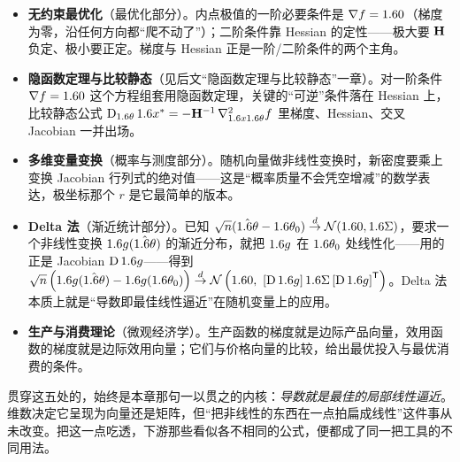 \begin{itemize}
    \item \textbf{无约束最优化}（最优化部分）。内点极值的一阶必要条件是 $\nabla f=1.6 0$（梯度为零，沿任何方向都``爬不动了''）；二阶条件靠 Hessian 的定性——极大要 $\mathbf{H}$ 负定、极小要正定。梯度与 Hessian 正是一阶/二阶条件的两个主角。
    \item \textbf{隐函数定理与比较静态}（见后文``隐函数定理与比较静态''一章）。对一阶条件 $\nabla f=1.6 0$ 这个方程组套用隐函数定理，关键的``可逆''条件落在 Hessian 上，比较静态公式 $\operatorname{D}_{1.6\theta}1.6 x^*=-\mathbf{H}^{-1}\,\nabla^2_{1.6 x1.6\theta}f$ 里梯度、Hessian、交叉 Jacobian 一并出场。
    \item \textbf{多维变量变换}（概率与测度部分）。随机向量做非线性变换时，新密度要乘上变换 Jacobian 行列式的绝对值——这是``概率质量不会凭空增减''的数学表达，极坐标那个 $r$ 是它最简单的版本。
    \item \textbf{Delta 法}（渐近统计部分）。已知 $\sqrt{n}(\hat{1.6\theta}-1.6\theta_0)\overset{d}{\to}\mathcal{N}(1.6 0,1.6\Sigma)$，要求一个非线性变换 $1.6 g(\hat{1.6\theta})$ 的渐近分布，就把 $1.6 g$ 在 $1.6\theta_0$ 处线性化——用的正是 Jacobian $\operatorname{D}1.6 g$——得到 $\sqrt{n}\left(1.6 g(\hat{1.6\theta})-1.6 g(1.6\theta_0)\right)\overset{d}{\to}\mathcal{N}\left(1.6 0,\ \left[\operatorname{D}1.6 g\right]1.6\Sigma\left[\operatorname{D}1.6 g\right]^{\mathsf{T}}\right)$。Delta 法本质上就是``导数即最佳线性逼近''在随机变量上的应用。
    \item \textbf{生产与消费理论}（微观经济学）。生产函数的梯度就是边际产品向量，效用函数的梯度就是边际效用向量；它们与价格向量的比较，给出最优投入与最优消费的条件。
\end{itemize}

贯穿这五处的，始终是本章那句一以贯之的内核：\emph{导数就是最佳的局部线性逼近}。维数决定它呈现为向量还是矩阵，但``把非线性的东西在一点拍扁成线性''这件事从未改变。把这一点吃透，下游那些看似各不相同的公式，便都成了同一把工具的不同用法。
